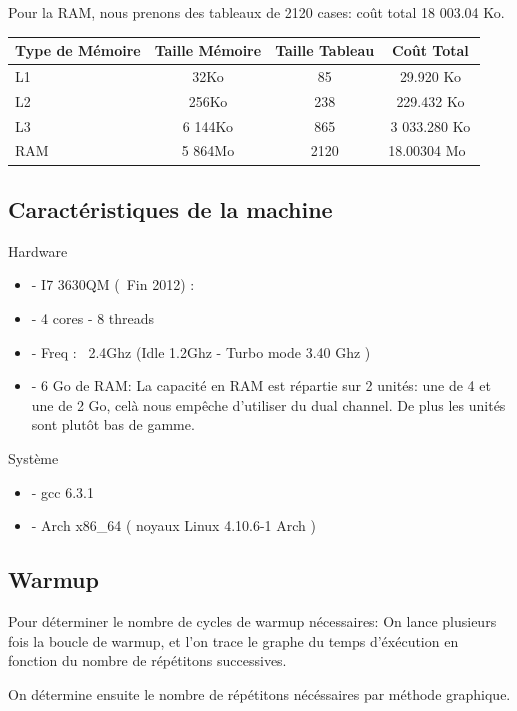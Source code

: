 \documentclass{report}
\begin{document}
Pour la RAM, nous prenons des tableaux de 2120 cases: coût total 18 003.04 Ko.

\begin{tabular}{ l c | c c }
    Type de Mémoire & Taille Mémoire & Taille Tableau & Coût Total\\\hline
    L1 & 32Ko & 85 & 29.920 Ko\\ 
    L2 & 256Ko & 238 & 229.432 Ko \\
    L3 & 6 144Ko & 865 & 3 033.280 Ko \\
    RAM & 5 864Mo & 2120 & 18.00304 Mo \\
\end{tabular}

\subsection*{Caractéristiques de la machine}

Hardware
\begin{itemize}
    \item{- I7 3630QM (~Fin 2012) :}
    \item{- 4 cores - 8 threads}
    \item{- Freq : ~2.4Ghz (Idle 1.2Ghz - Turbo mode 3.40 Ghz )}
    \item{- 6 Go de RAM:  La capacité en RAM est répartie sur 2 unités: une de 4 et une de 2 Go, celà nous empêche d'utiliser du dual channel. De plus les unités sont plutôt bas de gamme.}
\end{itemize}

Système
\begin{itemize}
    \item{- gcc 6.3.1}
    \item{- Arch x86\_64 ( noyaux Linux 4.10.6-1 Arch )}
\end{itemize}

\subsection*{Warmup}

Pour déterminer le nombre de cycles de warmup nécessaires: On lance plusieurs fois la boucle de warmup, et l'on trace le graphe du temps d'éxécution en fonction du nombre de répétitons successives.

On détermine ensuite le nombre de répétitons nécéssaires par méthode graphique.
\end{document}
